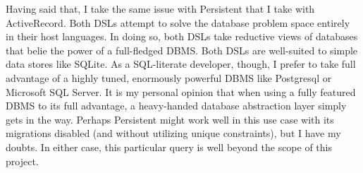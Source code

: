 Having said that, I take the same issue with Persistent that I take with ActiveRecord. Both DSLs attempt to solve the database problem space entirely in their host languages. In doing so, both DSLs take reductive views of databases that belie the power of a full-fledged DBMS. Both DSLs are well-suited to simple data stores like SQLite. As a SQL-literate developer, though, I prefer to take full advantage of a highly tuned, enormously powerful DBMS like Postgresql or Microsoft SQL Server. It is my personal opinion that when using a fully featured DBMS to its full advantage, a heavy-handed database abstraction layer simply gets in the way. Perhaps Persistent might work well in this use case with its migrations disabled (and without utilizing unique constraints), but I have my doubts. In either case, this particular query is well beyond the scope of this project.


